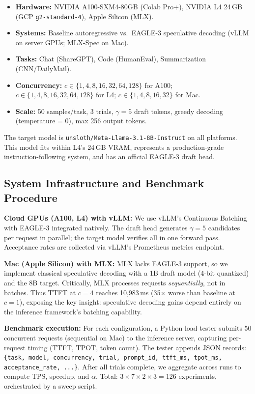 \documentclass[10pt,twocolumn]{article}
\begin{document}
\begin{itemize}[leftmargin=1.2em,itemsep=0pt,topsep=2pt]
  \item \textbf{Hardware:} NVIDIA A100-SXM4-80GB (Colab Pro+), NVIDIA L4 24\,GB
        (GCP \texttt{g2-standard-4}), Apple Silicon (MLX).
  \item \textbf{Systems:} Baseline autoregressive vs.\ EAGLE-3 speculative
        decoding (vLLM on server GPUs; MLX-Spec on Mac).
  \item \textbf{Tasks:} Chat (ShareGPT), Code (HumanEval), Summarization
        (CNN/DailyMail).
  \item \textbf{Concurrency:} $c \in \{1, 4, 8, 16, 32, 64, 128\}$ for A100;
        $c \in \{1, 4, 8, 16, 32, 64, 128\}$ for L4; $c \in \{1, 4, 8, 16, 32\}$
        for Mac.
  \item \textbf{Scale:} 50 samples/task, 3 trials, $\gamma = 5$ draft tokens,
        greedy decoding (temperature = 0), max 256 output tokens.
\end{itemize}

The target model is \texttt{unsloth/Meta-Llama-3.1-8B-Instruct} on all platforms.
This model fits within L4's 24\,GB VRAM, represents a production-grade
instruction-following system, and has an official EAGLE-3 draft head.

\subsection{System Infrastructure and Benchmark Procedure}

\textbf{Cloud GPUs (A100, L4) with vLLM:} We use vLLM's Continuous Batching with EAGLE-3 integrated natively. The draft head generates $\gamma=5$ candidates per request in parallel; the target model verifies all in one forward pass. Acceptance rates are collected via vLLM's Prometheus metrics endpoint.

\textbf{Mac (Apple Silicon) with MLX:} MLX lacks EAGLE-3 support, so we implement classical speculative decoding with a 1B draft model (4-bit quantized) and the 8B target. Critically, MLX processes requests \emph{sequentially}, not in batches. Thus TTFT at $c=4$ reaches 10,983\,ms (35× worse than baseline at $c=1$), exposing the key insight: speculative decoding gains depend entirely on the inference framework's batching capability.

\textbf{Benchmark execution:} For each configuration, a Python load tester submits 50 concurrent requests (sequential on Mac) to the inference server, capturing per-request timing (TTFT, TPOT, token count). The tester appends JSON records: \texttt{\{task, model, concurrency, trial, prompt\_id, ttft\_ms, tpot\_ms, acceptance\_rate, ...\}}. After all trials complete, we aggregate across runs to compute TPS, speedup, and $\alpha$. Total: $3 \times 7 \times 2 \times 3 = 126$ experiments, orchestrated by a sweep script.
\end{document}
